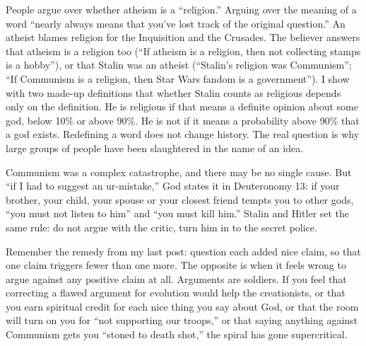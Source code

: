 
People argue over whether atheism is a ``religion.'' Arguing over the meaning of a word ``nearly always means that you've lost track of the original question.'' An atheist blames religion for the Inquisition and the Crusades. The believer answers that atheism is a religion too (``If atheism is a religion, then not collecting stamps is a hobby''), or that Stalin was an atheist (``Stalin's religion was Communism''; ``If Communism is a religion, then Star Wars fandom is a government''). I show with two made-up definitions that whether Stalin counts as religious depends only on the definition. He is religious if that means a definite opinion about some god, below 10\% or above 90\%. He is not if it means a probability above 90\% that a god exists. Redefining a word does not change history. The real question is why large groups of people have been slaughtered in the name of an idea.

Communism was a complex catastrophe, and there may be no single cause. But ``if I had to suggest an ur-mistake,'' God states it in Deuteronomy 13: if your brother, your child, your spouse or your closest friend tempts you to other gods, ``you must not listen to him'' and ``you must kill him.'' Stalin and Hitler set the same rule: do not argue with the critic, turn him in to the secret police. 

Remember the remedy from my last post: question each added nice claim, so that one claim triggers fewer than one more. The opposite is when it feels wrong to argue against any positive claim at all. Arguments are soldiers. If you feel that correcting a flawed argument for evolution would help the creationists, or that you earn spiritual credit for each nice thing you say about God, or that the room will turn on you for ``not supporting our troops,'' or that saying anything against Communism gets you ``stoned to death shot,'' the spiral has gone supercritical. 

